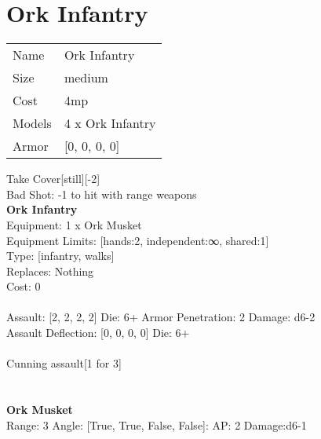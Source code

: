 \pagebreak\pagebreak

\section{ Ork Infantry }

\begin{tabular}{ll}
  Name & Ork Infantry \\
  Size & medium\\
  Cost & 4mp\\
  Models & 4 x Ork Infantry\\
  Armor & [0, 0, 0, 0]\\
\end{tabular}

\noindent Take Cover[still][-2]\\ 
Bad Shot: -1 to hit with range weapons\\ 


{\bf Ork Infantry } \\
Equipment: 1 x Ork Musket \\
Equipment Limits: [hands:2, independent:∞, shared:1] \\
Type: [infantry, walks] \\
Replaces: Nothing \\
Cost: 0\\
\ \\
Assault: [2, 2, 2, 2] Die: 6+ Armor Penetration: 2 Damage: d6-2 \\
Assault Deflection: [0, 0, 0, 0] Die: 6+\\
\\ 
Cunning assault[1 for 3]\\ 
 
\ \\

\ \\
{\bf Ork Musket } \\



Range: 3  Angle: [True, True, False, False]: AP: 2 Damage:d6-1 \\




 
\ \\



